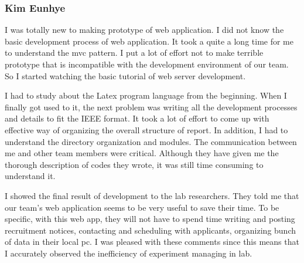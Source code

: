 \documentclass[letterpaper, 10 pt, conference]{ieeeconf}  %
\begin{document}
\subsubsection{Kim Eunhye\\}
I was totally new to making prototype of web application. I did not know the basic development process of web application. It took a quite a long time for me to understand the mvc pattern. I put a lot of effort not to make terrible prototype that is incompatible with the development environment of our team. So I started watching the basic tutorial of web server development.\\
I had to study about the Latex program language from the beginning. When I  finally got used to it, the next problem was writing all the development processes and details to fit the IEEE format. It took a lot of effort to come up with effective way of organizing the overall structure of report. In addition, I had to understand the directory organization and modules. The communication between me and other team members were critical. Although they have given me the thorough description of codes they wrote, it was still time consuming to understand it. \\
I showed the final result of development to the lab researchers. They told me that our team's web application seems to be very useful to save their time. To be specific, with this web app, they will not have to spend time writing and posting recruitment notices, contacting and scheduling with applicants, organizing bunch of data in their local pc. I was pleased with these comments since this means that I accurately observed the inefficiency of experiment managing in lab.\\
\end{document}

